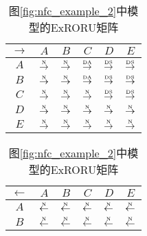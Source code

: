 \begin{table}[htbp]
  \begin{subtable}{1\textwidth}
    \vspace{1em}
    \centering
    \caption{图\ref{fig:nfc_example_2}中模型的ExRORU矩阵}
    \label{tab:nfc_example_2_matrix}
    \begin{minipage}[b]{0.3\textwidth}
      \centering
      \begin{tabular}{|c|c|c|c|c|c|} \hline
        $\rightarrow$ & $A$ & $B$ & $C$ & $D$ & $E$\\ \hline
        $A$ & $\overset{\text{\tiny{N}}}{\rightarrow}$ & $\overset{\text{\tiny{N}}}{\rightarrow}$ & $\overset{\text{\tiny{DA}}}{\rightarrow}$ & $\overset{\text{\tiny{DS}}}{\rightarrow}$ & $\overset{\text{\tiny{DS}}}{\rightarrow}$\\ \hline
        $B$ & $\overset{\text{\tiny{N}}}{\rightarrow}$ & $\overset{\text{\tiny{N}}}{\rightarrow}$ & $\overset{\text{\tiny{DA}}}{\rightarrow}$ & $\overset{\text{\tiny{DS}}}{\rightarrow}$ & $\overset{\text{\tiny{DS}}}{\rightarrow}$\\ \hline
        $C$ & $\overset{\text{\tiny{N}}}{\rightarrow}$ & $\overset{\text{\tiny{N}}}{\rightarrow}$ & $\overset{\text{\tiny{N}}}{\rightarrow}$ & $\overset{\text{\tiny{DS}}}{\rightarrow}$ & $\overset{\text{\tiny{DS}}}{\rightarrow}$\\ \hline
        $D$ & $\overset{\text{\tiny{N}}}{\rightarrow}$ & $\overset{\text{\tiny{N}}}{\rightarrow}$ & $\overset{\text{\tiny{N}}}{\rightarrow}$ & $\overset{\text{\tiny{N}}}{\rightarrow}$ & $\overset{\text{\tiny{N}}}{\rightarrow}$\\ \hline
        $E$ & $\overset{\text{\tiny{N}}}{\rightarrow}$ & $\overset{\text{\tiny{N}}}{\rightarrow}$ & $\overset{\text{\tiny{N}}}{\rightarrow}$ & $\overset{\text{\tiny{N}}}{\rightarrow}$ & $\overset{\text{\tiny{N}}}{\rightarrow}$\\ \hline
      \end{tabular}
    \end{minipage}
    \begin{minipage}[b]{0.3\textwidth}
      \centering
      \begin{tabular}{|c|c|c|c|c|c|} \hline
        $\leftarrow$ & $A$ & $B$ & $C$ & $D$ & $E$\\ \hline
        $A$ & $\overset{\text{\tiny{N}}}{\leftarrow}$ & $\overset{\text{\tiny{N}}}{\leftarrow}$ & $\overset{\text{\tiny{N}}}{\leftarrow}$ & $\overset{\text{\tiny{N}}}{\leftarrow}$ & $\overset{\text{\tiny{N}}}{\leftarrow}$\\ \hline
        $B$ & $\overset{\text{\tiny{N}}}{\leftarrow}$ & $\overset{\text{\tiny{N}}}{\leftarrow}$ & $\overset{\text{\tiny{N}}}{\leftarrow}$ & $\overset{\text{\tiny{N}}}{\leftarrow}$ & $\overset{\text{\tiny{N}}}{\leftarrow}$\\ \hline

\end{tabular}
\end{minipage}
\end{subtable}
\end{table}
